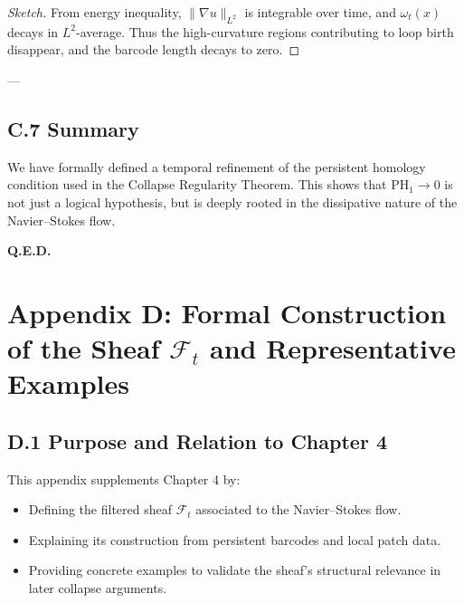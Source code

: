 \documentclass[11pt]{article}
\begin{document}
\begin{proof}[Sketch]
From energy inequality, \( \|\nabla u\|_{L^2} \) is integrable over time,  
and \( \omega_t(x) \) decays in \( L^2 \)-average.  
Thus the high-curvature regions contributing to loop birth disappear,  
and the barcode length decays to zero.
\end{proof}

---

\subsection*{C.7 Summary}

We have formally defined a temporal refinement of the persistent homology condition  
used in the Collapse Regularity Theorem.  
This shows that \( \mathrm{PH}_1 \to 0 \) is not just a logical hypothesis,  
but is deeply rooted in the dissipative nature of the Navier–Stokes flow.

\begin{flushright}
\textbf{Q.E.D.}
\end{flushright}




\section*{Appendix D: Formal Construction of the Sheaf \( \mathcal{F}_t \) and Representative Examples}

\subsection*{D.1 Purpose and Relation to Chapter 4}

This appendix supplements Chapter 4 by:

\begin{itemize}
  \item Defining the filtered sheaf \( \mathcal{F}_t \) associated to the Navier–Stokes flow.
  \item Explaining its construction from persistent barcodes and local patch data.
  \item Providing concrete examples to validate the sheaf's structural relevance in later collapse arguments.
\end{itemize}
\end{document}
